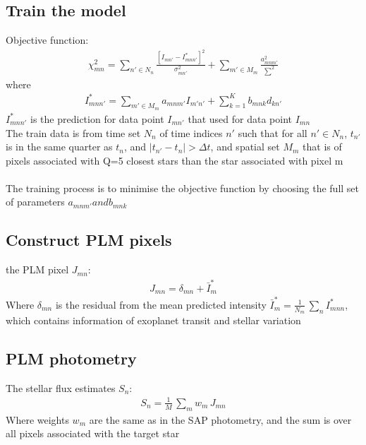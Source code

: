 \documentclass[]{article}
\begin{document}
\subsection{Train the model}
Objective function:
\begin{align*}
\chi_{mn}^{2}=\sum_{n' \in N_{n}} \frac{[I_{mn'}-I_{mnn'}^{*}]^{2}}{\sigma _{mn'}^{2}}+ \sum_{m' \in M_{m}} \frac{a_{mnm'}^{2}}{\sum ^{2}} 
\end{align*}
where
\begin{align*}
I_{mnn'}^{*}=\sum_{m' \in M_{m}} a_{mnm'}I_{m'n'}+ \sum_{k=1}^{K} b_{mnk} d_{kn'} 
\end{align*}
$I_{mnn'}^{*}$ is the prediction for data point $I_{mn'}$ that used for data point $I_{mn}$\\
The train data is from time set $N_n$ of time
  indices $n'$ such that for all $n'\in N_n$,
  $t_{n'}$ is in the same quarter as $t_n$,
  and $|t_{n'} - t_n|>\Delta t$, and spatial set $M_{m}$ that is of pixels associated with Q=5 closest stars than the star associated with pixel m\\ 
\\
The training process is to minimise the objective function by choosing the full set of parameters $a_{mnm'} and b_{mnk}$

\subsection{Construct PLM pixels}
the PLM pixel $J_{mn}$:
\begin{align*}
J_{mn} =\delta_{mn} + \bar{I}^{\ast}_m
\end{align*}
Where $\delta_{mn}$ is the residual from the mean predicted intensity  $\bar{I}^{\ast}_m=\frac{1}{N_m}\,\sum_n I^{\ast}_{mnn}$, which contains information of exoplanet transit and stellar variation

\subsection{PLM photometry}
The stellar flux estimates $S_{n}$:
\begin{align*}
S_n = \frac{1}{M}\,\sum_m w_m\,J_{mn}
\end{align*}
Where weights $w_m$ are the same as in the SAP photometry, and the sum is over all pixels associated with the target star
\end{document}
